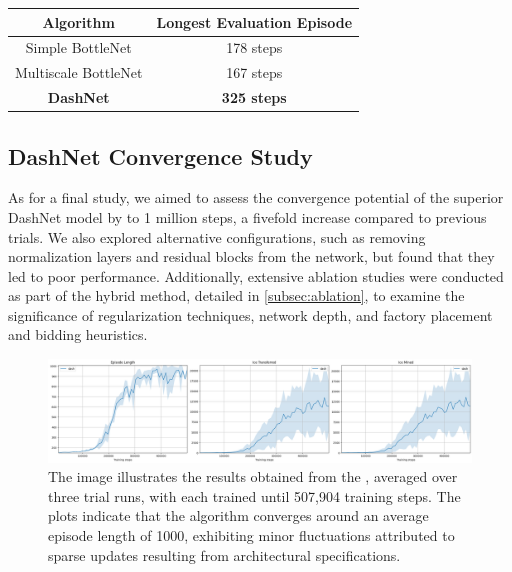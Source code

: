 \begin{table}[h!]
    \centering
    \begin{tabular}{|c|c|}
        \hline
        \textbf{Algorithm} & \textbf{Longest Evaluation Episode} \\
        \hline
        Simple BottleNet     & 178 steps \\
        Multiscale BottleNet & 167 steps \\
        \textbf{DashNet}    & \textbf{325 steps} \\
        \hline
    \end{tabular}
    \captionsetup{justification=justified, singlelinecheck=false, width=1\linewidth, labelfont=bf} 
    \label{tab:mono-results-table}
\end{table}

\subsection{DashNet Convergence Study}

\noindent As for a final study, we aimed to assess the convergence potential of the superior DashNet model by  to 1 million steps, a fivefold increase compared to previous trials. We also explored alternative configurations, such as removing normalization layers and residual blocks from the network, but found that they led to poor performance. Additionally, extensive ablation studies were conducted as part of the hybrid method, detailed in \autoref{subsec:ablation}, to examine the significance of regularization techniques, network depth, and factory placement and bidding heuristics.


\begin{figure}[htbp]
    \centering
    \includegraphics[width=1\linewidth]{images/results_monolithic/dash_1m.png}
    \captionsetup{justification=justified, singlelinecheck=false, width=1\linewidth, labelfont=bf} 
    \caption[]{The image illustrates the results obtained from the , averaged over three trial runs, with each trained until 507,904 training steps. The plots indicate that the algorithm converges around an average episode length of 1000, exhibiting minor fluctuations attributed to sparse updates resulting from architectural specifications.}
    \label{fig:mono-dash-1M}
\end{figure}

